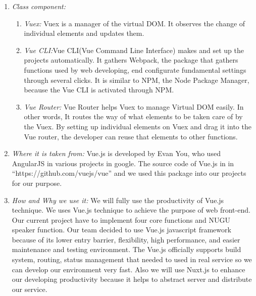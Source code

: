 \documentclass[conference]{IEEEtran}
\begin{document}
\begin{enumerate}
  \item \textit{Class component: } 
    \begin{enumerate}
	\item \textit {Vuex: }  Vuex is a manager of the virtual DOM. It observes the change of individual elements and updates them.\\
	\item \textit {Vue CLI:}Vue CLI(Vue Command Line Interface) makes and set up the projects automatically. It gathers Webpack, the package that gathers functions used by web developing, end configurate fundamental settings through several clicks. It is similar to NPM, the Node Package Manager, because the Vue CLI is activated through NPM.\\
	\item \textit {Vue Router:} Vue Router helps Vuex to manage Virtual DOM easily. In other words, It routes the way of what elements to be taken care of by the Vuex. By setting up individual elements on Vuex and drag it into the Vue router, the developer can reuse that elements to other functions.\\
	\end{enumerate}
  \item \textit{Where it is taken from: } Vue.js is developed by Evan You, who used AngularJS in various projects in google. The source code of Vue.js in in “https://github.com/vuejs/vue” and we used this package into our projects for our purpose.\\
  \item \textit{How and Why we use it: } We will fully use the productivity of Vue.js technique. We uses Vue.js technique to achieve the purpose of web front-end. Our current project have to implement four core functions and NUGU speaker function. Our team decided to use Vue.js javascript framework because of its lower entry barrier, flexibility, high performance, and easier maintenance and testing environment. The Vue.js officially supports build system, routing, status management that needed to used in real service so we can develop our environment very fast. Also we will use Nuxt.js to enhance our developing productivity because it helps to abstract server and distribute our service.\\
  \end{enumerate}
\end{document}
